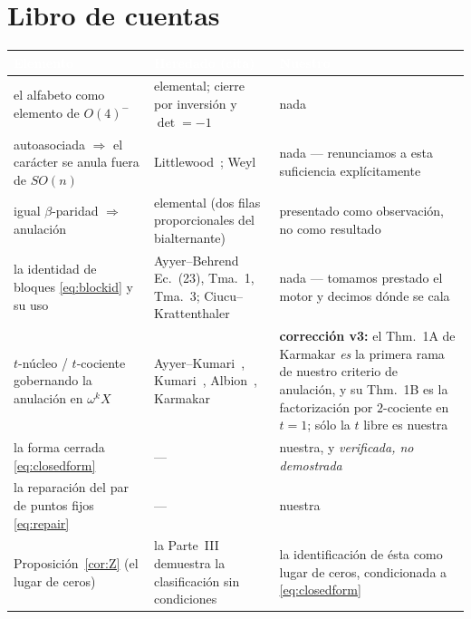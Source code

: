 \documentclass[11pt,a4paper]{article}
\begin{document}
\section{Libro de cuentas}\label{sec:ledger}

\begin{table}[!htbp]
\centering\small
\begin{tabular}{p{4.0cm}p{5.2cm}p{5.0cm}}
\toprule
\rowcolor{hdrblue}
\textcolor{white}{Elemento} & \textcolor{white}{Heredado (cita)} & \textcolor{white}{Nuestro}\\
\midrule
el alfabeto como elemento de $O(4)^-$ &
elemental; cierre por inversi\'on y $\det=-1$ &
nada\\
\midrule
\rowcolor{softgrey}
autoasociada $\Rightarrow$ el car\'acter se anula fuera de $SO(n)$ &
Littlewood~\cite[Cap.~XI]{LittlewoodBook}; Weyl~\cite{Weyl} &
nada --- renunciamos a esta suficiencia expl\'icitamente\\
\midrule
igual $\beta$-paridad $\Rightarrow$ anulaci\'on &
elemental (dos filas proporcionales del bialternante) &
presentado como observaci\'on, no como resultado\\
\midrule
\rowcolor{softgrey}
la identidad de bloques \eqref{eq:blockid} y su uso &
Ayyer--Behrend~\cite{AB} Ec.~(23), Tma.~1, Tma.~3; Ciucu--Krattenthaler~\cite{CK} &
nada --- tomamos prestado el motor y decimos d\'onde se cala\\
\midrule
$t$-n\'ucleo / $t$-cociente gobernando la anulaci\'on en $\omega^kX$ &
Ayyer--Kumari~\cite{AK}, Kumari~\cite{Kumari}, Albion~\cite{Albion},
Karmakar~\cite{Karmakar} &
\textbf{correcci\'on v3:} el Thm.~1A de Karmakar \emph{es} la primera rama de
nuestro criterio de anulaci\'on, y su Thm.~1B es la factorizaci\'on por
$2$-cociente en $t=1$; s\'olo la $t$ libre es nuestra\\
\midrule
\rowcolor{softgrey}
la forma cerrada \eqref{eq:closedform} & --- &
nuestra, y \emph{verificada, no demostrada}\\
\midrule
la reparaci\'on del par de puntos fijos \eqref{eq:repair} & --- & nuestra\\
\midrule
\rowcolor{softgrey}
Proposici\'on~\ref{cor:Z} (el lugar de ceros) & la Parte~III~\cite{PartIII} demuestra la
clasificaci\'on sin condiciones & la identificaci\'on de \'esta como lugar de ceros,
condicionada a \eqref{eq:closedform}\\

\end{tabular}
\end{table}
\end{document}
